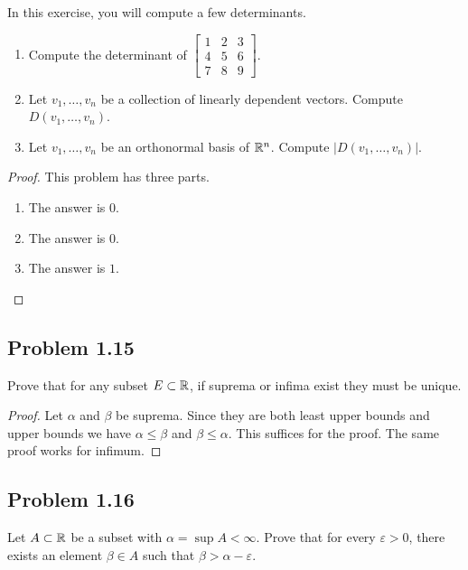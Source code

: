 \documentclass[12pt]{article}
\begin{document}
\begin{problem}
	In this exercise, you will compute a few determinants. 
    \begin{enumerate}[label = (\alph*)]
        \item Compute the determinant of $\begin{bmatrix} 1 & 2 & 3 \\ 4 & 5 & 6 \\ 7 & 8 & 9 \end{bmatrix}$. 
        \item Let $v_1, \ldots, v_n$ be a collection of linearly dependent vectors. Compute $D(v_1, \ldots, v_n)$. 
        \item Let $v_1, \ldots, v_n$ be an orthonormal basis of $\mathbb{R}^n$. Compute $|D(v_1, \ldots, v_n)|$. 
    \end{enumerate}
\end{problem}
\begin{proof}
	This problem has three parts.
	\begin{enumerate}[label = (\alph*)]
		\item The answer is $0$.
		\item The answer is $0$. 
		\item The answer is $1$.
	\end{enumerate}
\end{proof}

\newpage 

\subsection{Problem 1.15}

\begin{problem}
	Prove that for any subset $E \subset \mathbb{R}$, if suprema or infima exist they must be unique. 
\end{problem}

\begin{proof}
	Let $\alpha$ and $\beta$ be suprema. Since they are both least upper bounds and upper bounds we have $\alpha \leq \beta$ and $\beta \leq \alpha$. This suffices for the proof. The same proof works for infimum.
\end{proof}

\newpage 

\subsection{Problem 1.16}

\begin{problem}
	Let $A \subset \mathbb{R}$ be a subset with $\alpha = \sup A < \infty$. Prove that for every $\varepsilon > 0$, there exists an element $\beta \in A$ such that $\beta > \alpha - \varepsilon$. 
\end{problem}
\end{document}
